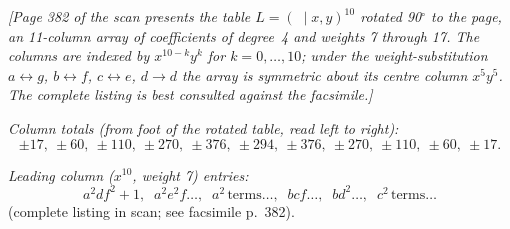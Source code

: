 \documentclass[11pt]{article}
\begin{document}
\newpage
\noindent
\textit{[Page 382 of the scan presents the table $L=(\;\mid
x,y)^{10}$ rotated 90$^{\circ}$ to the page, an 11-column array of
coefficients of degree~4 and weights 7 through 17.  The columns are
indexed by $x^{10-k}y^{k}$ for $k=0,\ldots,10$; under the
weight-substitution $a\leftrightarrow g$, $b\leftrightarrow f$,
$c\leftrightarrow e$, $d\to d$ the array is symmetric about its
centre column $x^{5}y^{5}$.  The complete listing is best consulted
against the facsimile.]}

\medskip
\noindent
\textit{Column totals (from foot of the rotated table, read left to
right):}
\[
\pm 17,\ \pm 60,\ \pm 110,\ \pm 270,\ \pm 376,\ \pm 294,\ \pm 376,\
\pm 270,\ \pm 110,\ \pm 60,\ \pm 17.
\]

\medskip
\noindent
\textit{Leading column ($x^{10}$, weight 7) entries:}
\[
a^{2}df^{2}+1,\;\; a^{2}e^{2}f\ldots,\;\; a^{2}\,\text{terms}\ldots,
\;\; bc f\ldots,\;\; bd^{2}\ldots,\;\; c^{2}\,\text{terms}\ldots
\]
(complete listing in scan; see facsimile p.~382).

\newpage
\end{document}
